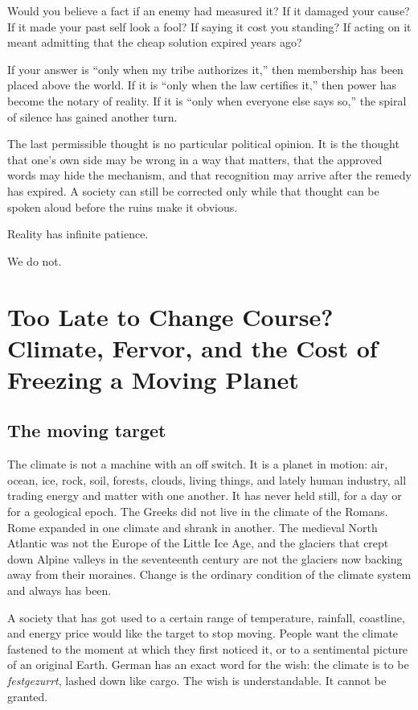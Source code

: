 \documentclass[12pt,a4paper]{book}
\begin{document}
Would you believe a fact if an enemy had measured it? If it damaged your cause? If it made your past self look a fool? If saying it cost you standing? If acting on it meant admitting that the cheap solution expired years ago?

If your answer is ``only when my tribe authorizes it,'' then membership has been placed above the world. If it is ``only when the law certifies it,'' then power has become the notary of reality. If it is ``only when everyone else says so,'' the spiral of silence has gained another turn.

The last permissible thought is no particular political opinion. It is the thought that one's own side may be wrong in a way that matters, that the approved words may hide the mechanism, and that recognition may arrive after the remedy has expired. A society can still be corrected only while that thought can be spoken aloud before the ruins make it obvious.

Reality has infinite patience.

We do not.


\chapter[Too Late to Change Course?]{Too Late to Change Course? Climate, Fervor, and the Cost of Freezing a Moving Planet}
\label{chap:moving-climate}

\section{The moving target}

The climate is not a machine with an off switch. It is a planet in motion: air, ocean, ice, rock, soil, forests, clouds, living things, and lately human industry, all trading energy and matter with one another. It has never held still, for a day or for a geological epoch. The Greeks did not live in the climate of the Romans. Rome expanded in one climate and shrank in another. The medieval North Atlantic was not the Europe of the Little Ice Age, and the glaciers that crept down Alpine valleys in the seventeenth century are not the glaciers now backing away from their moraines. Change is the ordinary condition of the climate system and always has been.

A society that has got used to a certain range of temperature, rainfall, coastline, and energy price would like the target to stop moving. People want the climate fastened to the moment at which they first noticed it, or to a sentimental picture of an original Earth. German has an exact word for the wish: the climate is to be \emph{festgezurrt}, lashed down like cargo. The wish is understandable. It cannot be granted.
\end{document}
